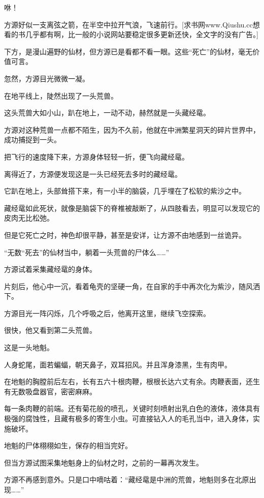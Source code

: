 
\begin{this_body}

咻！

方源好似一支离弦之箭，在半空中拉开气浪，飞速前行。[求书网www.Qiushu.cc想看的书几乎都有啊，比一般的小说网站要稳定很多更新还快，全文字的没有广告。]

下方，是漫山遍野的仙材，但方源已是看都不看一眼。这些“死亡”的仙材，毫无价值可言。

忽然，方源目光微微一凝。

在地平线上，陡然出现了一头荒兽。

这头荒兽大如小山，趴在地上，一动不动，赫然就是一头藏经鼋。

方源对这种荒兽一点都不陌生，因为不久前，他就在中洲繁星洞天的碎片世界中，成功捕捉到一头。

把飞行的速度降下来，方源身体轻轻一折，便飞向藏经鼋。

离得近了，方源便发现这是一头已经死去多时的藏经鼋。

它趴在地上，头部耸搭下来，有一小半的脑袋，几乎埋在了松软的紫沙之中。

藏经鼋如此死状，就像是脑袋下的脊椎被敲断了，从四肢看去，明显可以发现它的皮肉无比松弛。

但是它死亡之时，神色却很平静，甚至是安详，让方源不由地感到一丝诡异。

“无数“死去”的仙材当中，躺着一头荒兽的尸体么……”

方源试着采集藏经鼋的身体。

片刻后，他心中一沉，看着龟壳的坚硬一角，在自家的手中再次化为紫沙，随风洒下。

方源目光一阵闪烁，几个呼吸之后，他离开这里，继续飞空探索。

很快，他又看到第二头荒兽。

这是一头地魁。

人身蛇尾，面若蝙蝠，朝天鼻子，双耳招风。并且浑身漆黑，生有肉甲。

在地魁的胸膛前后左右，长有五六十根肉鞭，根根长达六丈有余。肉鞭表面，还生有无数吸盘器官，密密麻麻。

每一条肉鞭的前端。还有菊花般的喷孔，关键时刻喷射出乳白色的液体，液体具有极强的腐蚀性，且藏有极多的寄生小虫。可直接钻入人的毛孔当中，进入身体，实施破坏。

地魁的尸体栩栩如生，保存的相当完好。

但当方源试图采集地魁身上的仙材之时，之前的一幕再次发生。

方源不再感到意外。只是口中嘀咕着：“藏经鼋是中洲的荒兽，地魁则多在北原出现……”


\end{this_body}
